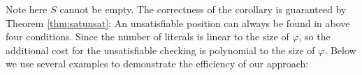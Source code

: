 \documentclass[conference]{IEEEtran}
\newtheorem{corollary}{Corollary}
\def\phi{\varphi}
\def\ff{\mathit{ff}}
\def\tt{\mathit{tt}}
\def\ofp#1{\mathit{ofp}(#1)}
\def\nondeter{\perp}
\def\inf{\mathit{inf}}
\begin{document}
\iffalse
\begin{corollary}\label{coro:abstract}
  Given an LTL formula $\phi$ and let $S=\{l|l\in \ofp{\phi} \wedge l.duration=\geq\}$, then $\phi$ is unsatisfiable if one of the following conditions is true:
  \begin{enumerate}
    \item There exists $l\in \ofp{\phi}$ such that $l.start=i$, and $\ofp{\phi}\downarrow_i\equiv\ff$;
    \item $\ofp{\phi}[\tt/\mathcal{L}-S]\equiv\ff$;
    \item There exists $l\in \ofp{\phi}$ such that $l.start=
\nondeter$, and 
    $\ofp{\phi}[\tt/\mathcal{L}-S'\cup\{l\}]\equiv\ff$, where $S'\subseteq S$ and $l.start = 0$ for each 
    $l\in S'$;
    \item There exists $l\in \ofp{\phi}$ such that $l.duration=\inf$, and 
    $\ofp{\phi}[\tt/\mathcal{L}-S\cup\{l\}]\equiv\ff$;
  \end{enumerate}
\end{corollary}
\fi

Note here $S$ cannot be empty. The correctness of the corollary is
guaranteed by Theorem \ref{thm:satunsat}: An unsatisfiable position
can always be found in above four conditions. Since the number of
literals is linear to the size of $\phi$, so the additional cost for
the unsatisfiable checking is polynomial to the size of $\phi$. Below
we use several examples to demonstrate the efficiency of our approach:
\end{document}
